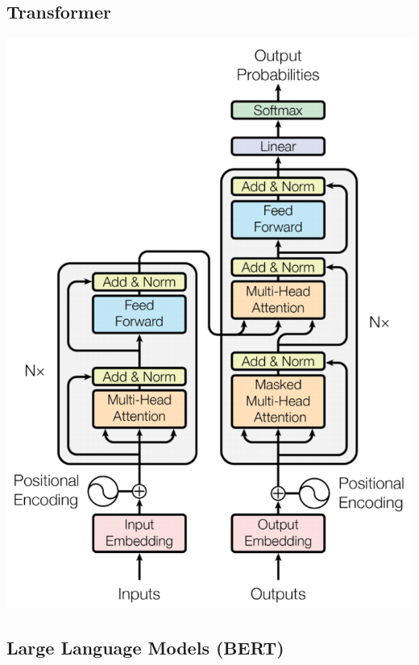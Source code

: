 \subsection{Transformer} \vspace{-0.18cm}
\begin{center}
    \includegraphics[scale=0.18, angle=-90]{contents/imgs/transformer.png}
\end{center} \vspace{-0.4cm}

\subsection{Large Language Models (BERT)}


